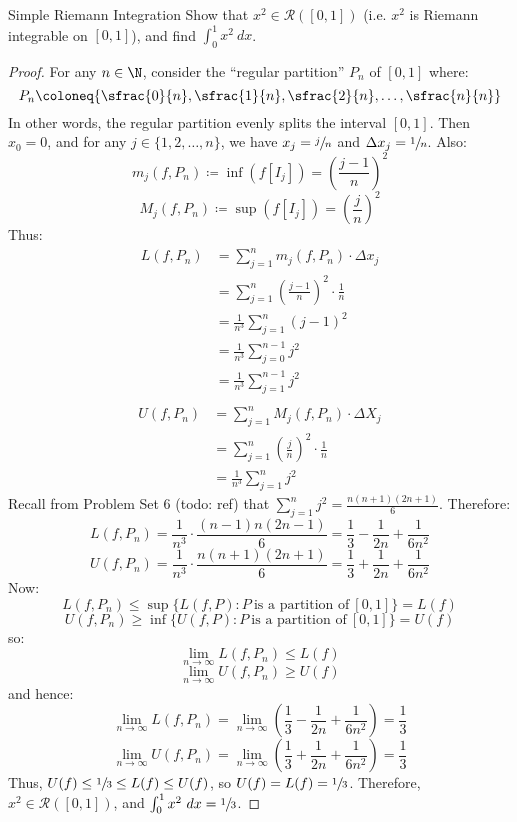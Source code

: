 \begin{exbox}{Simple Riemann Integration}{}
    Show that $x^2 \in \mathcal{R}([0,1])$ (i.e. $x^2$ is Riemann integrable on $[0,1]$), and find $\int_0^1 x^2\ dx$.
    \tcblower
    \begin{proof}
        For any $n \in \N$, consider the ``regular partition'' $P_n$ of $[0,1]$ where:
        \[ P_n \coloneq \{ \sfrac{0}{n}, \sfrac{1}{n}, \sfrac{2}{n}, \ldots, \sfrac{n}{n} \} \]
        In other words, the regular partition evenly splits the interval $[0,1]$. Then $x_0 = 0$, and for any $j \in \{1, 2, \ldots, n\}$, we have $x_j = \sfrac{j}{n}$ and $\Delta x_j = \sfrac{1}{n}$. Also:
        \[ m_j (f, P_n) \coloneq \inf ( f[I_j] ) = \left( \frac{j-1}{n} \right)^2 \]
        \[ M_j(f, P_n) \coloneq \sup ( f[I_j] ) = \left( \frac{j}{n} \right)^2 \]
        Thus:
        \begin{align*}
            L(f, P_n)
            &= \sum_{j=1}^{n} m_j(f, P_n) \cdot \Delta x_j \\
            &= \sum_{j=1}^{n} \left( \frac{j-1}{n} \right)^2 \cdot \frac{1}{n} \\
            &= \frac{1}{n^3} \sum_{j=1}^{n} \left( j-1 \right)^2 \\
            &= \frac{1}{n^3} \sum_{j=0}^{n-1} j^2 \\ 
            &= \frac{1}{n^3} \sum_{j=1}^{n-1} j^2 \\ 
        \end{align*}
        \begin{align*}
            U(f, P_n)
            &= \sum_{j=1}^{n} M_j(f, P_n) \cdot \Delta X_j \\
            &= \sum_{j=1}^{n} \left( \frac{j}{n} \right)^2 \cdot \frac{1}{n} \\
            &= \frac{1}{n^3} \sum_{j=1}^{n} j^2
        \end{align*}
        Recall from Problem Set 6 (todo: ref) that $\sum_{j=1}^{n} j^2 = \frac{n(n+1)(2n+1)}{6}$. Therefore:
        \[ L(f, P_n) = \frac{1}{n^3} \cdot \frac{(n-1)n(2n-1)}{6} = \frac{1}{3} - \frac{1}{2n} + \frac{1}{6n^2} \]
        \[ U(f, P_n) = \frac{1}{n^3} \cdot \frac{n(n+1)(2n+1)}{6} = \frac{1}{3} + \frac{1}{2n} + \frac{1}{6n^2} \]
        Now:
        \[ L(f, P_n) \leq \sup \{ L(f,P) : P\ \text{is a partition of}\ [0,1] \} = L(f) \]
        \[ U(f, P_n) \geq \inf \{ U(f,P) : P\ \text{is a partition of}\ [0,1] \} = U(f) \]
        so:
        \[ \lim_{n\to\infty} L(f, P_n) \leq L(f) \]
        \[ \lim_{n\to\infty} U(f, P_n) \geq U(f) \]
        and hence:
        \[ \lim_{n\to\infty} L(f, P_n) = \lim_{n\to\infty} \left( \frac{1}{3} - \frac{1}{2n} + \frac{1}{6n^2} \right) = \frac{1}{3} \]
        \[ \lim_{n\to\infty} U(f, P_n) = \lim_{n\to\infty} \left( \frac{1}{3} + \frac{1}{2n} + \frac{1}{6n^2} \right) = \frac{1}{3} \]
        Thus, $U(f) \leq \sfrac{1}{3} \leq L(f) \leq U(f)$, so $U(f) = L(f) = \sfrac{1}{3}$. Therefore, $x^2 \in \mathcal{R}([0,1])$, and $\int_0^1 x^2\ dx = \sfrac{1}{3}$.
    \end{proof}
\end{exbox}


